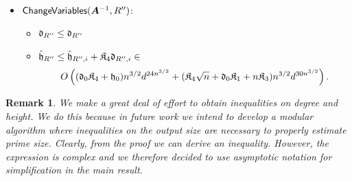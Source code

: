 \documentclass[12pt]{article}
\def\mA{{\bm A}}
\def\fd{\frak{d}}
\def\fh{\frak{h}}
\def\fK{\frak{K}}
\newtheorem{remark}[theorem]{Remark}
\def\ChangeVariables{{\sf ChangeVariables}}
\def\mA{{\bm A}}
\begin{document}
\begin{itemize}
\item $\ChangeVariables(\bm A^{-1},R'')$: 
\begin{itemize}
    \item $\fd_{R''}\leq \fd_{R''}$
    \item $\hat{\fh}_{R''} \leq \hat{\fh}_{R'',i}+\fK_4\fd_{R'',i} \in$
    \[
    O\left((\frak{d}_0\fK_4+\frak{h}_0)n^{3/2}d^{24n^{3/2}} + (\fK_4\sqrt{n}+\frak{d}_0\fK_1+n\fK_3)n^{3/2}d^{30n^{3/2}}\right).
    \]
\end{itemize}



\end{itemize}




\begin{remark}
We make a great deal of effort to obtain inequalities on degree and height. We do this because in future work we intend to develop a modular algorithm where inequalities on the output size are necessary to properly estimate prime size. Clearly, from the proof we can derive an inequality. However, the expression is complex and we therefore decided to use asymptotic notation for simplification in the main result.
\end{remark}
\end{document}
